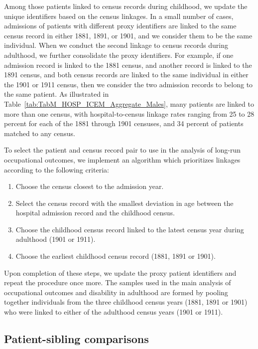 \documentclass[12pt,english]{article}
\begin{document}
Among those patients linked to census records during childhood, we update the unique identifiers based on the census linkages. In a small number of cases, admissions of patients with different proxy identifiers are linked to the same census record in either 1881, 1891, or 1901, and we consider them to be the same individual. When we conduct the second linkage to census records during adulthood, we further consolidate the proxy identifiers. For example, if one admission record is linked to the 1881 census, and another record is linked to the 1891 census, and both census records are linked to the same individual in either the 1901 or 1911 census, then we consider the two admission records to belong to the same patient. As illustrated in Table~\ref{tab:TabM_HOSP_ICEM_Aggregate_Males}, many patients are linked to more than one census, with hospital-to-census linkage rates ranging from 25 to 28 percent for each of the 1881 through 1901 censuses, and 34 percent of patients matched to any census. 

To select the patient and census record pair to use in the analysis of long-run occupational outcomes, we implement an algorithm which prioritizes linkages according to the following criteria: 

\begin{enumerate}
    \item Choose the census closest to the admission year.
    \item Select the census record with the smallest deviation in age between the hospital admission record and the childhood census.
    \item Choose the childhood census record linked to the latest census year during adulthood (1901 or 1911).
    \item Choose the earliest childhood census record (1881, 1891 or 1901). 
\end{enumerate}
Upon completion of these steps, we update the proxy patient identifiers and repeat the procedure once more. The samples used in the main analysis of occupational outcomes and disability in adulthood are formed by pooling together individuals from the three childhood census years (1881, 1891 or 1901) who were linked to either of the adulthood census years (1901 or 1911).

\subsection{Patient-sibling comparisons\label{subsubsec:pat-sib-comp}}
\end{document}
